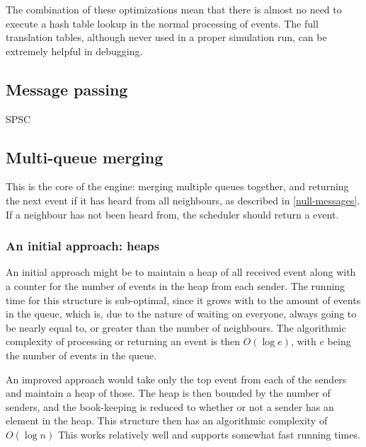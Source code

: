 The combination of these optimizations mean that there is almost no need to execute a hash table lookup in the normal processing of events.
The full translation tables, although never used in a proper simulation run, can be extremely helpful in debugging.

\subsection{Message passing} \label{rustasim-message-passing}
SPSC


\subsection{Multi-queue merging} \label{rusatim-tree}

This is the core of the engine: merging multiple queues together, and returning the next event if it has heard from all neighbours, as described in \ref{null-messages}.
If a neighbour has not been heard from, the scheduler should return a  event.

\subsubsection{An initial approach: heaps}
An initial approach might be to maintain a heap of all received event along with a counter for the number of events in the heap from each sender.
The running time for this structure is sub-optimal, since it grows with to the amount of events in the queue, which is, due to the nature of waiting on everyone, always going to be nearly equal to, or greater than the number of neighbours.
The algorithmic complexity of processing or returning an event is then $O(\log e)$, with $e$ being the number of events in the queue.

An improved approach would take only the top event from each of the senders and maintain a heap of those.
The heap is then bounded by the number of senders, and the book-keeping is reduced to whether or not a sender has an element in the heap.
This structure then has an algorithmic complexity of $O\left(\log n\right)$
This works relatively well and supports somewhat fast running times. %


